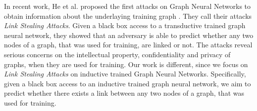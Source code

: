   In recent work, He et al. proposed the first attacks on Graph Neural Networks to obtain information about the underlaying training graph \cite{DBLP:journals/corr/abs-2005-02131}.
  They call their attacks \emph{Link Stealing Attacks}.
  Given a black box access to a transductive trained graph neural network, they showed that an adversary is able to predict whether any two nodes of a graph, that was used for training, are linked or not.
  The attacks reveal serious concerns on the intellectual property, confidentiality and privacy of graphs, when they are used for training.
  Our work is different, since we focus on \emph{Link Stealing Attacks} on inductive trained Graph Neural Networks.
  Specifically, given a black box access to an inductive trained graph neural network, we aim to predict whether there exists a link between any two nodes of a graph, that was used for training.
